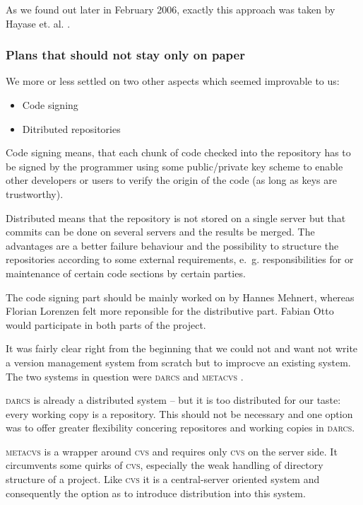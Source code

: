 \documentclass[fleqn, 10pt, a4paper]{report} \usepackage{amssymb}
\begin{document}
As we found out later in February 2006, exactly this approach was
taken by Hayase et. al. \cite{HMI05}.

\subsubsection{Plans that should not stay only on paper}

We more or less settled on two other aspects which seemed improvable
to us:

\begin{itemize}
\item Code signing
\item Ditributed repositories
\end{itemize}

Code signing means, that each chunk of code checked into the
repository has to be signed by the programmer using some
public/private key scheme to enable other developers or users to
verify the origin of the code (as long as keys are trustworthy).

Distributed means that the repository is not stored on a single server
but that commits can be done on several servers and the results be
merged. The advantages are a better failure behaviour and the
possibility to structure the repositories according to some external
requirements, e.~g. responsibilities for or maintenance of certain
code sections by certain parties.

The code signing part should be mainly worked on by Hannes Mehnert,
whereas Florian Lorenzen felt more reponsible for the distributive
part. Fabian Otto would participate in both parts of the project.

It was fairly clear right from the beginning that we could not and
want not write a version management system from scratch but to
improcve an existing system. The two systems in question were
\textsc{darcs} \cite{Darc06} and \textsc{metacvs} \cite{Mcvs06}.

\textsc{darcs} is already a distributed system -- but it is too
distributed for our taste: every working copy is a repository.  This
should not be necessary and one option was to offer greater
flexibility concering repositores and working copies in
\textsc{darcs}.

\textsc{metacvs} is a wrapper around \textsc{cvs} \cite{Cvs06}
and requires only
\textsc{cvs} on the server side. It circumvents some quirks of
\textsc{cvs}, especially the weak handling of directory structure of a
project. Like \textsc{cvs} it is a central-server oriented system and
consequently the option as to introduce distribution into this system.
\end{document}
